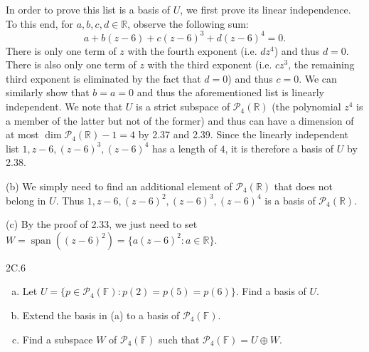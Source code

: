 \documentclass{exam}
\DeclareMathOperator{\spn}{span}
\begin{document}
In order to prove this list is a basis of $U$, we first prove its linear independence. To this end, for $a, b, c, d\in\mathbb R$, observe the following sum:
\[
    a + b(z - 6) + c(z - 6)^3 + d(z - 6)^4 = 0.
\]
There is only one term of $z$ with the fourth exponent (i.e. $dz^4$) and thus $d = 0$. There is also only one term of $z$ with the third exponent (i.e. $cz^3$, the remaining third exponent is eliminated by the fact that $d = 0$) and thus $c = 0$. We can similarly show that $b = a = 0$ and thus the aforementioned list is linearly independent. We note that $U$ is a strict subspace of $\mathcal P_4(\mathbb R)$ (the polynomial $z^4$ is a member of the latter but not of the former) and thus can have a dimension of at most $\dim\mathcal P_4(\mathbb R) - 1 = 4$ by 2.37 and 2.39. Since the linearly independent list $1, z - 6, (z - 6)^3, (z - 6)^4$ has a length of $4$, it is therefore a basis of $U$ by 2.38.

(b) We simply need to find an additional element of $\mathcal P_4(\mathbb R)$ that does not belong in $U$. Thus $1, z - 6, (z - 6)^2, (z - 6)^3, (z - 6)^4$ is a basis of $\mathcal P_4(\mathbb R)$.

(c) By the proof of 2.33, we just need to set $W = \spn((z - 6)^2) = \{a(z - 6)^2 : a\in\mathbb R\}$.

\begin{problem}{2C.6}
    \begin{enumerate}[(a)]
        \item Let $U = \{p\in\mathcal P_4(\mathbb F) : p(2) = p(5) = p(6)\}$. Find a basis of $U$.
        \item Extend the basis in (a) to a basis of $\mathcal P_4(\mathbb F)$.
        \item Find a subspace $W$ of $\mathcal P_4(\mathbb F)$ such that $\mathcal P_4(\mathbb F) = U\oplus W$.
    \end{enumerate}
\end{problem}
\end{document}
